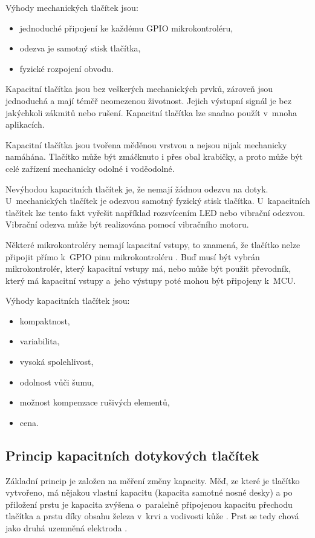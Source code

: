 Výhody mechanických tlačítek jsou:
\begin{itemize}
  \item jednoduché připojení ke každému GPIO mikrokontroléru,
  \item odezva je samotný stisk tlačítka,
  \item fyzické rozpojení obvodu.
\end{itemize}

Kapacitní tlačítka jsou bez veškerých mechanických prvků, zároveň jsou jednoduchá a mají téměř neomezenou 
životnost. Jejich výstupní signál je bez jakýchkoli zákmitů nebo rušení. Kapacitní tlačítka lze snadno použít v~mnoha aplikacích. 

Kapacitní tlačítka jsou tvořena měděnou vrstvou a nejsou nijak mechanicky namáhána. Tlačítko může být zmáčknuto i přes 
obal krabičky, a proto může být celé zařízení mechanicky odolné i voděodolné. 

Nevýhodou kapacitních tlačítek je, že nemají žádnou odezvu na dotyk. U~mechanických tlačítek je odezvou samotný fyzický 
stisk tlačítka. U~kapacitních tlačítek lze tento fakt vyřešit například rozsvícením LED nebo vibrační odezvou. Vibrační 
odezva může být realizována pomocí vibračního motoru. 

Některé mikrokontroléry nemají kapacitní vstupy, to znamená, že tlačítko nelze připojit přímo k~GPIO pinu mikrokontroléru \cite{ESP_C3_dtsh}. 
Buď musí být vybrán mikrokontrolér, který kapacitní vstupy má, nebo může být použit převodník, který má kapacitní vstupy a~jeho 
výstupy poté mohou být připojeny k~MCU. 

Výhody kapacitních tlačítek jsou:
\begin{itemize}
  \item kompaktnost,
  \item variabilita,
  \item vysoká spolehlivost,
  \item odolnost vůči šumu,
  \item možnost kompenzace rušivých elementů,
  \item cena. 
\end{itemize}

\subsection{Princip kapacitních dotykových tlačítek}
Základní princip je založen na měření změny kapacity. Měď, ze které je tlačítko vytvořeno, má
nějakou vlastní kapacitu (kapacita samotné nosné desky) a po přiložení prstu je kapacita zvýšena o~paralelně 
připojenou kapacitu přechodu tlačítka a prstu díky obsahu železa v~krvi a vodivosti kůže \cite{PrincipKapTl}. 
Prst se tedy chová jako druhá uzemněná elektroda \cite{PrincipKapTl}. 


